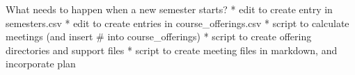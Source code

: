 What needs to happen when a new semester starts?
* edit to create entry in semesters.csv
* edit to create entries in course_offerings.csv
* script to calculate meetings (and insert # into course_offerings)
* script to create offering directories and support files
* script to create meeting files in markdown, and incorporate plan
